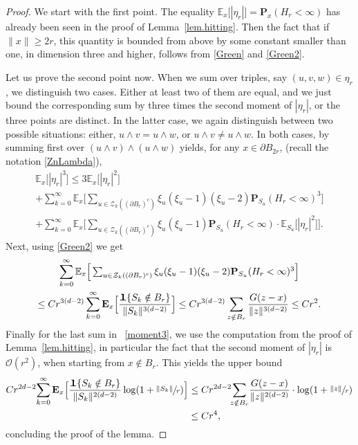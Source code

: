 \documentclass[JEP,XML,SOM,Unicode,NoFloatCountersInSection,published]{cedram}
\let\ts\textstyle
\theoremstyle{plain}
\theoremstyle{definition}
\newcommand{\1}{{\text{\Large $\mathfrak 1$}}}
\begin{document}
\begin{proof}
We start with the first point. The equality $\mathbb E_x\big[|\eta_r|\big]=\mathbf P_x(H_r<\infty)$ has already been seen in the proof of Lemma~\ref{lem.hitting}. Then the fact that if $\|x\|\ge 2r$, this quantity is bounded from above by some constant smaller than one, in dimension three and higher, follows from \eqref{Green} and \eqref{Green2}.

Let us prove the second point now. When we sum over triples, say $(u,v,w)\in \eta_r$, we distinguish two cases.
Either at least two of them are equal, and we just bound the corresponding sum by three times the second moment of $|\eta_r|$,
or the three points are distinct. In the latter case, we again
distinguish between two possible situations:
either, $u\wedge v = u\wedge w$, or $u\wedge v \neq u\wedge w$.
In both cases, by summing first over $(u\wedge v)\wedge(u\wedge w)$ yields,
for any $x\in \partial B_{2r}$, (recall the notation \eqref{ZnLambda}),
\begin{multline}\label{moment3}
\mathbb E_x\big[|\eta_r|^3\big]
\le 3\mathbb E_x\big[|\eta_r|^2\big]\\
+ \sum_{k=0}^\infty \mathbb E_x\Big[\ts
\sum_{u\in \mathcal Z_k((\partial B_r)^c)}
\xi_u(\xi_u-1)(\xi_u-2) \mathbf P_{S_u}(H_r <\infty)^3\Big]\\
+ \sum_{k=0}^\infty
\mathbb E_x\Big[\ts\sum_{u\in \mathcal Z_k((\partial B_r)^c)}
\xi_u(\xi_u-1) \mathbf P_{S_u}(H_r <\infty)\cdot \mathbb E_{S_u} \big[|\eta_r|^2\big] \Big].
\end{multline}
Next, using \eqref{Green2} we get
\begin{multline*}
\sum_{k=0}^\infty \mathbb E_x\Big[\ts\sum_{u\in \mathcal Z_k((\partial B_r)^c)}
\xi_u(\xi_u-1)(\xi_u-2) \mathbf P_{S_u}(H_r <\infty)^3\Big]\\
\le C r^{3(d-2)} \sum_{k=0}^\infty
\mathbf E_x\Big[\frac{\1\{S_k\notin B_r\}}{\|S_k\|^{3(d-2)}} \Big]\le Cr^{3(d-2)} \sum_{z\notin B_r} \frac{G(z-x)}{\|z\|^{3(d-2)}}\le Cr^2.
\end{multline*}
Finally for the last sum in ~\eqref{moment3}, we use the computation from the proof of Lemma~\ref{lem.hitting}, in particular the fact that
the second moment of $|\eta_r|$ is $\mathcal O(r^2)$, when starting from $x\notin B_r$.
This yields the upper bound
\begin{align*}
Cr^{2d-2}\!\sum_{k=0}^\infty \mathbf E_x\Big[\frac{\1\{S_k\notin B_r\}}{ \|S_k\|^{2(d-2)}}\log(1+\sfrac{\|S_k\|}{r}) \Big] &\le Cr^{2d-2}\!\!\sum_{z\notin B_r}\!
\frac{G(z-x)}{\|z\|^{2(d-2)}}\cdot \log (1+\sfrac{\|z\|}{r})\\
&\le Cr^4,
\end{align*}
concluding the proof of the lemma.
\end{proof}
\end{document}
